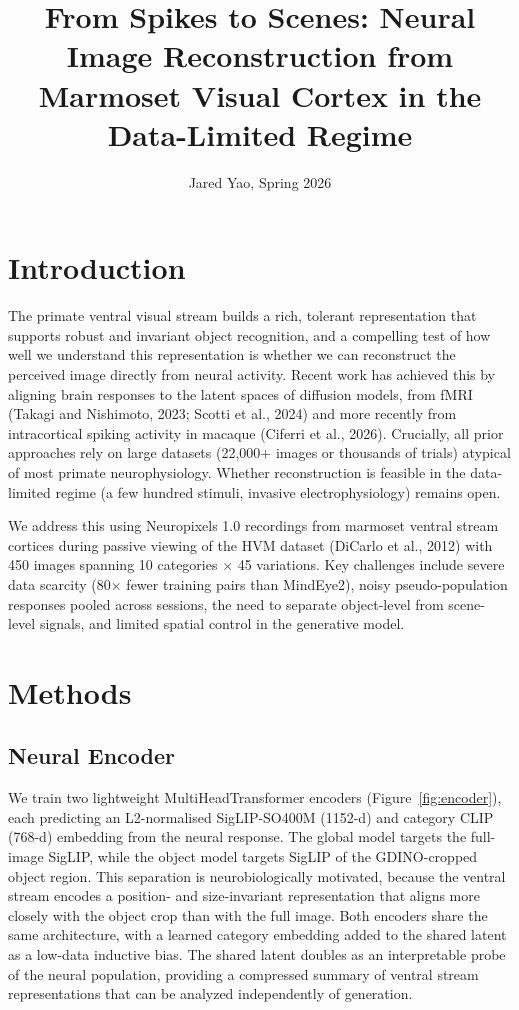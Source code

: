 \documentclass[10pt]{article}
\title{\vspace{-2em}From Spikes to Scenes: Neural Image Reconstruction from Marmoset Visual Cortex in the Data-Limited Regime\vspace{-0.5em}}
\author{Jared Yao, Spring 2026}
\date{\vspace{-2em}}
\begin{document}
\maketitle

\section{Introduction}

The primate ventral visual stream builds a rich, tolerant representation that supports robust and invariant object recognition, and a compelling test of how well we understand this representation is whether we can reconstruct the perceived image directly from neural activity. Recent work has achieved this by aligning brain responses to the latent spaces of diffusion models, from fMRI (Takagi and Nishimoto, 2023; Scotti et al., 2024) and more recently from intracortical spiking activity in macaque (Ciferri et al., 2026). Crucially, all prior approaches rely on large datasets (22{,}000+ images or thousands of trials) atypical of most primate neurophysiology. Whether reconstruction is feasible in the data-limited regime (a few hundred stimuli, invasive electrophysiology) remains open.

We address this using Neuropixels 1.0 recordings from marmoset ventral stream cortices during passive viewing of the HVM dataset (DiCarlo et al., 2012) with 450 images spanning 10 categories $\times$ 45 variations. Key challenges include severe data scarcity (80$\times$ fewer training pairs than MindEye2), noisy pseudo-population responses pooled across sessions, the need to separate object-level from scene-level signals, and limited spatial control in the generative model.

\section{Methods}

\subsection{Neural Encoder}

We train two lightweight MultiHeadTransformer encoders (Figure~\ref{fig:encoder}), each predicting an L2-normalised SigLIP-SO400M (1152-d) and category CLIP (768-d) embedding from the neural response. The global model targets the full-image SigLIP, while the object model targets SigLIP of the GDINO-cropped object region. This separation is neurobiologically motivated, because the ventral stream encodes a position- and size-invariant representation that aligns more closely with the object crop than with the full image. Both encoders share the same architecture, with a learned category embedding added to the shared latent as a low-data inductive bias. The shared latent doubles as an interpretable probe of the neural population, providing a compressed summary of ventral stream representations that can be analyzed independently of generation.
\end{document}
